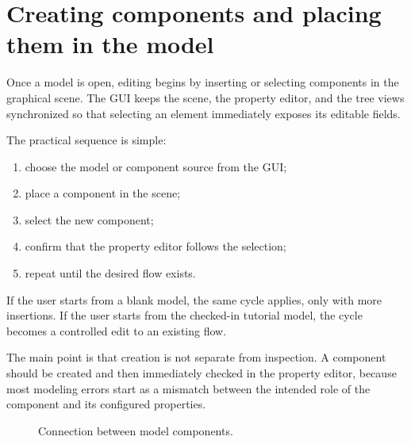 \section{Creating components and placing them in the model}
\label{sec:model-editing-creating-components}

Once a model is open, editing begins by inserting or selecting components in the graphical scene. The
GUI keeps the scene, the property editor, and the tree views synchronized so that selecting an element
immediately exposes its editable fields.

The practical sequence is simple:
\begin{enumerate}
\item choose the model or component source from the GUI;
\item place a component in the scene;
\item select the new component;
\item confirm that the property editor follows the selection;
\item repeat until the desired flow exists.
\end{enumerate}

If the user starts from a blank model, the same cycle applies, only with more insertions. If the user
starts from the checked-in tutorial model, the cycle becomes a controlled edit to an existing flow.

The main point is that creation is not separate from inspection. A component should be created and then
immediately checked in the property editor, because most modeling errors start as a mismatch between the
intended role of the component and its configured properties.

\begin{figure}[htbp]
\centering
\caption{Connection between model components.}
\label{fig:model-editing-connection}
\end{figure}

